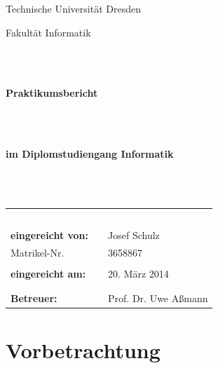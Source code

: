 \documentclass[12pt]{article}
\begin{document}
 
\thispagestyle{empty}
\begin{center}
\Large{Technische Universität Dresden}\\
\end{center}
 
 
\begin{center}
\Large{Fakultät Informatik}
\end{center}
\begin{verbatim}
 
 
\end{verbatim}
\begin{center}
\textbf{\LARGE{Praktikumsbericht}}
\end{center}
\begin{verbatim}
 
 
\end{verbatim}
\begin{center}
\textbf{im Diplomstudiengang Informatik}
\end{center}
\begin{verbatim}
 
 
\end{verbatim}
 
\begin{flushleft}
\begin{tabular}{lll}

& & \\
& & \\
& & \\
& & \\
& & \\
\textbf{eingereicht von:} & & Josef Schulz \\
Matrikel-Nr. & & 3658867 \\
& & \\
\textbf{eingereicht am:} & & 20. März 2014\\
& & \\
& & \\
\textbf{Betreuer:} & & Prof. Dr. Uwe Aßmann
\end{tabular}
\end{flushleft}
 

\newpage

\tableofcontents

\newpage

\section{Vorbetrachtung}
\end{document}
